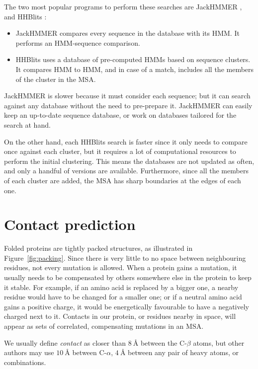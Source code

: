 The two most popular programs to perform these searches are JackHMMER \citep{jh}, and HHBlits \citep{hhblits}:

\begin{itemize}
\item JackHMMER compares every sequence in the database with its HMM.
It performs an HMM-sequence comparison.
\item HHBlits uses a database of pre-computed HMMs based on sequence clusters.
It compares HMM to HMM, and in case of a match, includes all the members of the cluster in the MSA.
\end{itemize}

JackHMMER is slower
because it must consider each sequence; but it can search against any database without the need to pre-prepare it.
JackHMMER can easily keep an up-to-date sequence database, or work on databases tailored for the search at hand.

On the other hand, each HHBlits search is faster since it only needs to compare once against each cluster, but it requires a lot of computational resources to perform the initial clustering.
This means the databases are not updated as often, and only a handful of versions are available.
Furthermore, since all the members of each cluster are added, the MSA has sharp boundaries at the edges of each one.


\section{Contact prediction}\label{sec:contacts}
Folded proteins are tightly packed structures, as illustrated in Figure~\ref{fig:packing}.
Since there is very little to no space between neighbouring residues, not every mutation is allowed.
When a protein gains a mutation, it usually needs to be compensated by others somewhere else in the protein to keep it stable.
For example, if an amino acid is replaced by a bigger one, a nearby residue would have to be changed for a smaller one; or if a neutral amino acid gains a positive charge, it would be energetically favourable to have a negatively charged next to it.
Contacts in our protein, or residues nearby in space, will appear as sets of correlated, compensating mutations in an MSA.

We usually define \emph{contact}  as closer than $\SI{8}{\angstrom}$ between the C-$\beta$ atoms,
but other authors may use $\SI{10}{\angstrom}$ between C-$\alpha$, $\SI{4}{\angstrom}$ between any pair of heavy atoms, or combinations.

